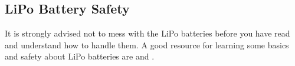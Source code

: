 \subsection{LiPo Battery Safety}
\begin{tcolorbox}[colback=yellow!75!,colframe=red]
It is strongly advised not to mess with the LiPo batteries before you
have read and understand how to handle them. A good resource for
learning some basics and safety about LiPo batteries are
\citep{tjintech:lipo-basics} and \citep{tjintech:lipo-safety}.
\end{tcolorbox}
 
